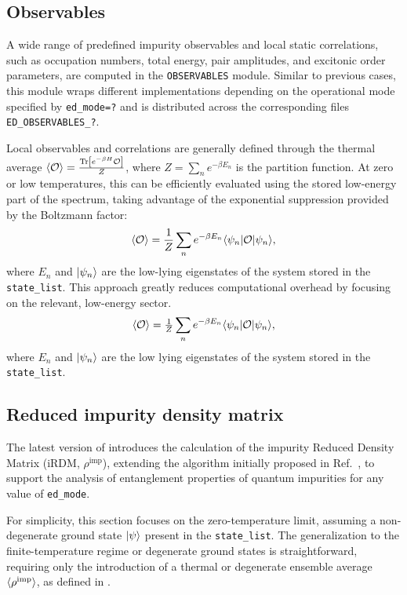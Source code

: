 \documentclass[edipack2.tex]{subfiles}
\begin{document}
\subsection{Observables}\label{sSecObc}
A wide range of predefined impurity observables and local 
static correlations, such as occupation numbers, total 
energy, pair amplitudes, and excitonic order parameters, 
are computed in the \texttt{OBSERVABLES} module. Similar to 
previous cases, this module wraps different implementations 
depending on the operational mode specified by 
{\tt ed\_mode=?} and is distributed across the corresponding 
files {\tt ED\_OBSERVABLES\_?}. 



Local observables and correlations are generally defined 
through the thermal average 
$\langle {\cal O}\rangle = \frac{{\rm Tr}\left[e^{-\beta H}{\cal O}\right]}{Z}$, 
where $Z = \sum_n e^{-\beta E_n}$ is the partition function. 
At zero or low temperatures, this can be efficiently 
evaluated using the stored low-energy part of the spectrum, 
taking advantage of the exponential suppression provided by 
the Boltzmann factor:
\begin{equation}
\langle {\cal O}\rangle = \frac{1}{Z}\sum_n e^{-\beta E_n}
\langle \psi_n| {\cal O} |\psi_n\rangle,
\label{eq:thermal_average}
\end{equation}
where $E_n$ and $|\psi_n\rangle$ are the low-lying eigenstates 
of the system stored in the {\tt state\_list}. This approach 
greatly reduces computational overhead by focusing on the 
relevant, low-energy sector.
\begin{equation}
  \langle {\cal O}\rangle  = \tfrac{1}{Z}\sum_n e^{-\beta  E_n}
  \langle \psi_n|{\cal O}|\psi_n\rangle,
  \label{eq:thermal_average}
\end{equation}
where $E_n$ and $|\psi_n\rangle$ are the low lying eigenstates of the
system stored in the {\tt state\_list}. 


\subsection{Reduced impurity density matrix}\label{sSecRDM}
The latest version of \NAME introduces the calculation of the 
impurity Reduced Density Matrix (iRDM, $\rho^\mathrm{imp}$), 
extending the algorithm initially proposed in 
Ref.~, to support the analysis of entanglement 
properties of quantum impurities for any value of  {\tt ed\_mode}.

For simplicity, this section focuses on the zero-temperature limit, 
assuming a non-degenerate ground state $|\psi\rangle$ present in the 
{\tt state\_list}. The generalization to the finite-temperature regime 
or degenerate ground states is straightforward, requiring only the 
introduction of a thermal or degenerate 
ensemble average $\langle \rho^\mathrm{imp} \rangle$, as defined in 
.
\end{document}
